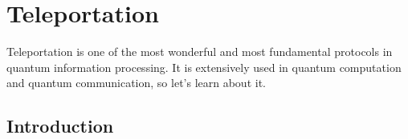 \chapter{Teleportation}


Teleportation is one of the most wonderful and most fundamental protocols in quantum information processing. It is extensively used in quantum computation and quantum communication, so let's learn about it.

\section{Introduction}


